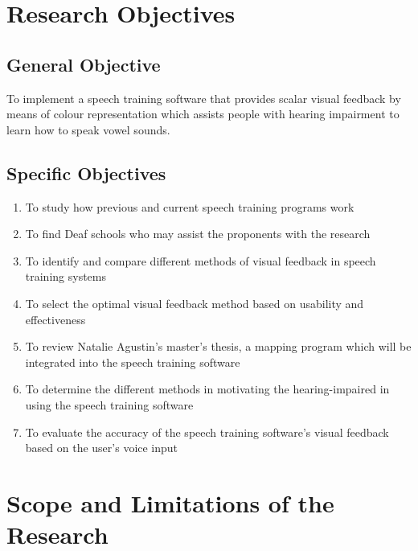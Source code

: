 \section{Research Objectives}
\label{sec:researchobjectives}

\subsection{General Objective}
\label{sec:generalobjective}

\begin{comment}
To implement a speech training software that provides visual feedback to assist people with hearing impairment in order to learn how to speak vowel sounds.
\end{comment}

To implement a speech training software that provides scalar visual feedback by means of colour representation which assists people with hearing impairment to learn how to speak vowel sounds.

\subsection{Specific Objectives}
\label{sec:specificobjectives}

\begin{enumerate}
\item To study how previous and current speech training programs work
\item To find Deaf schools who may assist the proponents with the research
\item To identify and compare different methods of visual feedback in speech training systems
\item To select the optimal visual feedback method based on usability and effectiveness
\item To review Natalie Agustin's \citeyear{agustin:2014:SOM} master's thesis, a mapping program which will be integrated into the speech training software
\item To determine the different methods in motivating the hearing-impaired in using the speech training software
\item To evaluate the accuracy of the speech training software's visual feedback based on the user's voice input
\end{enumerate}

\section{Scope and Limitations of the Research}
\label{sec:scopelimitations}

